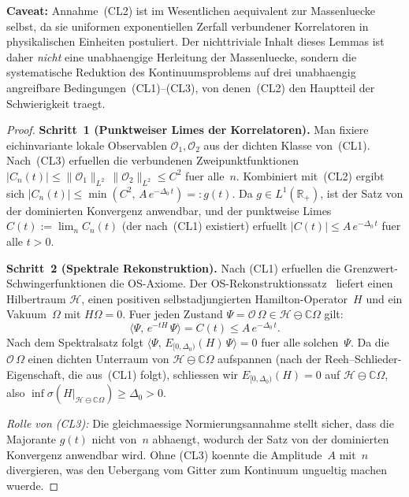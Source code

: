 \documentclass[12pt,a4paper]{article}
\theoremstyle{definition}
\theoremstyle{plain}
\theoremstyle{remark}
\begin{document}
\textbf{Caveat:} Annahme~(CL2) ist im Wesentlichen aequivalent zur Massenluecke selbst, da sie uniformen exponentiellen Zerfall verbundener Korrelatoren in physikalischen Einheiten postuliert. Der nichttriviale Inhalt dieses Lemmas ist daher \emph{nicht} eine unabhaengige Herleitung der Massenluecke, sondern die systematische Reduktion des Kontinuumsproblems auf drei unabhaengig angreifbare Bedingungen~(CL1)--(CL3), von denen~(CL2) den Hauptteil der Schwierigkeit traegt.

\begin{proof}
\textbf{Schritt~1 (Punktweiser Limes der Korrelatoren).}
Man fixiere eichinvariante lokale Observablen $\mathcal{O}_1, \mathcal{O}_2$ aus der
dichten Klasse von~(CL1). Nach~(CL3) erfuellen die verbundenen Zweipunktfunktionen
$|C_n(t)| \leq \|\mathcal{O}_1\|_{L^2}\,\|\mathcal{O}_2\|_{L^2} \leq C^2$
fuer alle~$n$. Kombiniert mit~(CL2) ergibt sich $|C_n(t)| \leq \min(C^2,\,A\,e^{-\Delta_0\,t})
=: g(t)$. Da $g \in L^1(\mathbb{R}_+)$, ist der Satz von der dominierten Konvergenz
anwendbar, und der punktweise Limes $C(t) := \lim_n C_n(t)$ (der nach~(CL1) existiert)
erfuellt $|C(t)| \leq A\,e^{-\Delta_0\,t}$ fuer alle $t > 0$.

\textbf{Schritt~2 (Spektrale Rekonstruktion).}
Nach (CL1) erfuellen die Grenzwert-Schwingerfunktionen die OS-Axiome. Der
OS-Rekonstruktionssatz~\cite{OsterwalderSchrader1973} liefert einen
Hilbertraum $\mathcal{H}$, einen positiven selbstadjungierten Hamilton-Operator~$H$
und ein Vakuum~$\Omega$ mit $H\Omega = 0$. Fuer jeden Zustand
$\Psi = \mathcal{O}\,\Omega \in \mathcal{H} \ominus \mathbb{C}\Omega$ gilt:
\[
    \langle \Psi,\,e^{-tH}\,\Psi \rangle = C(t) \leq A\,e^{-\Delta_0\,t}.
\]
Nach dem Spektralsatz folgt $\langle \Psi,\,E_{[0,\Delta_0)}(H)\,\Psi \rangle = 0$
fuer alle solchen~$\Psi$. Da die $\mathcal{O}\,\Omega$ einen dichten Unterraum
von $\mathcal{H} \ominus \mathbb{C}\Omega$ aufspannen (nach der Reeh--Schlieder-Eigenschaft,
die aus~(CL1) folgt), schliessen wir $E_{[0,\Delta_0)}(H) = 0$ auf
$\mathcal{H} \ominus \mathbb{C}\Omega$, also $\inf\sigma(H|_{\mathcal{H}
\ominus \mathbb{C}\Omega}) \geq \Delta_0 > 0$.

\emph{Rolle von (CL3):} Die gleichmaessige Normierungsannahme stellt sicher, dass die
Majorante $g(t)$ nicht von~$n$ abhaengt, wodurch der Satz von der dominierten Konvergenz
anwendbar wird. Ohne (CL3) koennte die Amplitude~$A$ mit~$n$ divergieren, was den
Uebergang vom Gitter zum Kontinuum ungueltig machen wuerde.
\end{proof}
\end{document}
